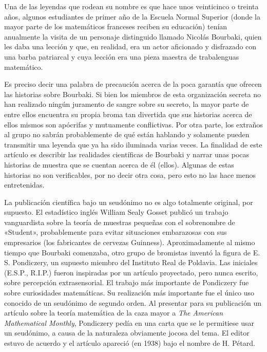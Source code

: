\documentclass[a4paper, 12pt]{article}
\begin{document}
Una de las leyendas que rodean su nombre es que hace unos veinticinco o 
treinta años, algunos estudiantes de primer año de la Escuela Normal 
Superior (donde la mayor parte de los matemáticos franceses reciben su 
educación) tenían anualmente la visita de un personaje distinguido 
llamado Nicolás Bourbaki, quien les daba una lección y que, en 
realidad, era un actor aficionado y disfrazado con una barba patriarcal y 
cuya lección era una pieza maestra de trabalenguas matemático. 

Es preciso decir una palabra de precaución acerca de la poca 
garantía que ofrecen las historias sobre Bourbaki. Si bien los miembros 
de esta organización secreta no han realizado ningún juramento de 
sangre sobre su secreto, la mayor parte de entre ellos encuentra su propia 
broma tan divertida que sus historias acerca de ellos mismos son 
apócrifas y mutuamente conflictivas. Por otra parte, los extraños al 
grupo no sabrán probablemente de qué están hablando y solamente 
pueden transmitir una leyenda que ya ha sido iluminada varias veces. La 
finalidad de este artículo es describir las realidades científicas 
de Bourbaki y narrar unas pocas historias de muestra que se cuentan acerca 
de él (ellos). Algunas de estas historias no son verificables, por no 
decir otra cosa, pero esto no las hace menos entretenidas. 

La publicación científica bajo un seudónimo no es algo 
totalmente original, por supuesto. El estadístico inglés William 
Sealy Gosset publicó un trabajo vanguardista sobre la teoría de 
muestras pequeñas con el sobrenombre de «Student», probablemente para 
evitar situaciones embarazosas con sus empresarios (los fabricantes de 
cervezas  Guinness). Aproximadamente al mismo tiempo que Bourbaki 
comenzaba, otro grupo de bromistas inventó la figura de E. S. 
Pondiczery, un supuesto miembro del Instituto Real de Poldavia. Las 
iniciales (E.S.P., R.I.P.) fueron inspiradas por un artículo 
proyectado, pero nunca escrito, sobre percepción extrasensorial. El 
trabajo más importante de Pondiczery fue sobre curiosidades 
matemáticas. Su realización más importante fue el único uso 
conocido de un seudónimo de segundo orden. Al presentar para su 
publicación un artículo sobre la teoría matemática de la 
caza mayor a {\it The American Mathematical Monthly}, Pondiczery pedía en una 
carta que se le permitiese usar un seudónimo, a causa de la naturaleza 
obviamente jocosa del tema. El editor estuvo de acuerdo y el artículo 
apareció (en 1938) bajo el nombre de H. Pétard. 
\end{document}
